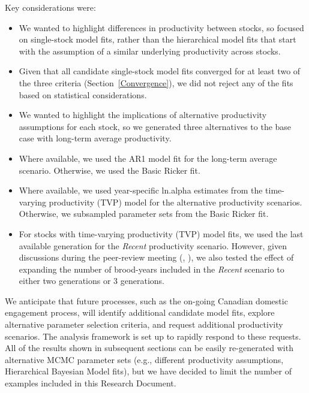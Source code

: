 \documentclass[french,11pt]{book}
\begin{document}
Key considerations were:
\begin{itemize}

\item
  We wanted to highlight differences in productivity between stocks, so focused on single-stock model fits, rather than the hierarchical model fits that start with the assumption of a similar underlying productivity across stocks.
\item
  Given that all candidate single-stock model fits converged for at least two of the three criteria (Section~\ref{Convergence}), we did not reject any of the fits based on statistical considerations.
\item
  We wanted to highlight the implications of alternative productivity assumptions for each stock, so we generated three alternatives to the base case with long-term average productivity.
\item
  Where available, we used the AR1 model fit for the long-term average scenario. Otherwise, we used the Basic Ricker fit.
\item
  Where available, we used year-specific ln.alpha estimates from the time-varying productivity (TVP) model for the alternative productivity scenarios. Otherwise, we subsampled parameter sets from the Basic Ricker fit.
\item
  For stocks with time-varying productivity (TVP) model fits, we used the last available generation for the \emph{Recent} productivity scenario. However, given discussions during the peer-review meeting (, ), we also tested the effect of expanding the number of brood-years included in the \emph{Recent} scenario to either two generations or 3 generations.
\end{itemize}
We anticipate that future processes, such as the on-going Canadian domestic engagement process, will identify additional candidate model fits, explore alternative parameter selection criteria, and request additional productivity scenarios. The analysis framework is set up to rapidly respond to these requests. All of the results shown in subsequent sections can be easily re-generated with alternative MCMC parameter sets (e.g., different productivity assumptions, Hierarchical Bayesian Model fits), but we have decided to limit the number of examples included in this Research Document.

\clearpage
\end{document}
